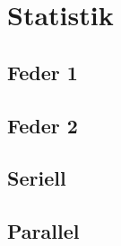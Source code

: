 \documentclass[../main.tex]{subfiles} %
\begin{document}
\chapter{Statistik}\label{ch:statistik}
    \section{Feder 1}\label{sec:feder-12}

    \section{Feder 2}\label{sec:feder-22}

    \section{Seriell}\label{sec:seriell2}

    \section{Parallel}\label{sec:parallel2}
\end{document}
